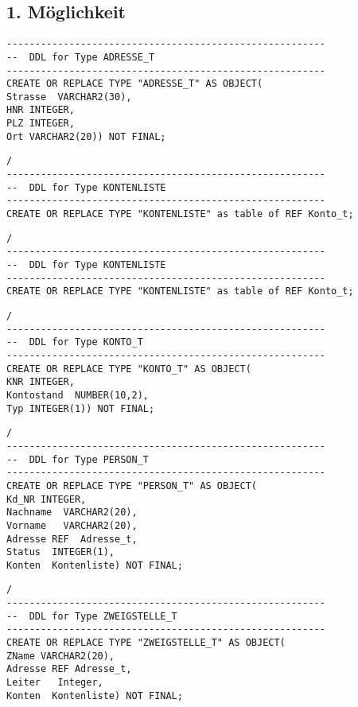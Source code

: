 \documentclass{scrartcl}
\begin{document}
\subsection*{1. Möglichkeit}
\begin{lstlisting}
--------------------------------------------------------
--  DDL for Type ADRESSE_T
--------------------------------------------------------
CREATE OR REPLACE TYPE "ADRESSE_T" AS OBJECT(
Strasse  VARCHAR2(30),
HNR INTEGER,
PLZ INTEGER,
Ort VARCHAR2(20)) NOT FINAL;
\end{lstlisting}
\begin{lstlisting}
/
--------------------------------------------------------
--  DDL for Type KONTENLISTE
--------------------------------------------------------
CREATE OR REPLACE TYPE "KONTENLISTE" as table of REF Konto_t;
\end{lstlisting}
\begin{lstlisting}
/
--------------------------------------------------------
--  DDL for Type KONTENLISTE
--------------------------------------------------------
CREATE OR REPLACE TYPE "KONTENLISTE" as table of REF Konto_t;
\end{lstlisting}
\begin{lstlisting}
/
--------------------------------------------------------
--  DDL for Type KONTO_T
--------------------------------------------------------
CREATE OR REPLACE TYPE "KONTO_T" AS OBJECT(
KNR INTEGER,
Kontostand  NUMBER(10,2),
Typ INTEGER(1)) NOT FINAL;
\end{lstlisting}
\begin{lstlisting}
/
--------------------------------------------------------
--  DDL for Type PERSON_T
--------------------------------------------------------
CREATE OR REPLACE TYPE "PERSON_T" AS OBJECT(
Kd_NR INTEGER,
Nachname  VARCHAR2(20),
Vorname   VARCHAR2(20),
Adresse REF  Adresse_t,
Status  INTEGER(1),
Konten  Kontenliste) NOT FINAL;
\end{lstlisting}
\begin{lstlisting}
/
--------------------------------------------------------
--  DDL for Type ZWEIGSTELLE_T
--------------------------------------------------------
CREATE OR REPLACE TYPE "ZWEIGSTELLE_T" AS OBJECT(
ZName VARCHAR2(20),
Adresse REF Adresse_t,
Leiter   Integer,
Konten  Kontenliste) NOT FINAL;
\end{lstlisting}
\end{document}
